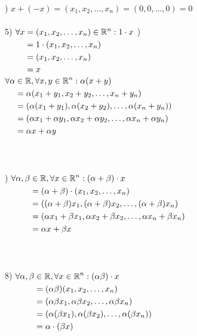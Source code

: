 \begin{example}
	) $x + (-x) = (x_1, x_2, \dots, x_n)= (0, 0, \dots, 0) = 0$ \\ 
	\\
	5) $
	\begin{aligned}[t]
			\forall x &= (x_1, x_2, \dots, x_n) \in \mathbb{R}^n: 1\cdot x\\
			&= 1 \cdot (x_1, x_2, \dots, x_n)\\
			&= (x_1, x_2, \dots, x_n) \\
			&= x
	\end{aligned}
$
\newpage{}) $
\begin{aligned}[t]
	\forall \alpha&\in\mathbb{R} , \forall x,y \in \mathbb{R}^n: \alpha (x+y)\\
	&= \alpha(x_1+y_1, x_2+y_2, \dots, x_n+y_n)\\
	&= (\alpha(x_1+y_1), \alpha(x_2+y_2), \dots, \alpha(x_n+y_n))\\
	&= (\alpha x_1+\alpha y_1, \alpha x_2+\alpha y_2, \dots, \alpha x_n+\alpha y_n)\\
	&= \alpha x + \alpha y
\end{aligned}
$\\
\\
\\
\\
) $
\begin{aligned}[t]
	\forall \alpha, \beta &\in \mathbb{R}, \forall x\in \mathbb{R}^n: (\alpha + \beta)\cdot x\\
	&= (\alpha + \beta)\cdot (x_1, x_2, \dots, x_n)\\
	&= ((\alpha+\beta)x_1, (\alpha+\beta)x_2, \dots, (\alpha+\beta)x_n)\\
	&= (\alpha x_1 + \beta x_1, \alpha x_2 + \beta x_2, \dots , \alpha x_n + \beta x_n)\\
	&= \alpha x + \beta x
\end{aligned}
$\\
\\\\
\\
8) $
\begin{aligned}[t]
		\forall \alpha, \beta &\in \mathbb{R}, \forall x\in \mathbb{R}^n: (\alpha \beta)\cdot x\\
		&= (\alpha\beta)(x_1, x_2, \dots, x_n)\\
		&= (\alpha\beta x_1, \alpha\beta x_2, \dots, \alpha\beta x_n)\\
		&= (\alpha(\beta x_1), \alpha(\beta x_2), \dots, \alpha(\beta x_n))\\
		&= \alpha \cdot (\beta x)
\end{aligned}
$
\end{example}
\newpage
{}

